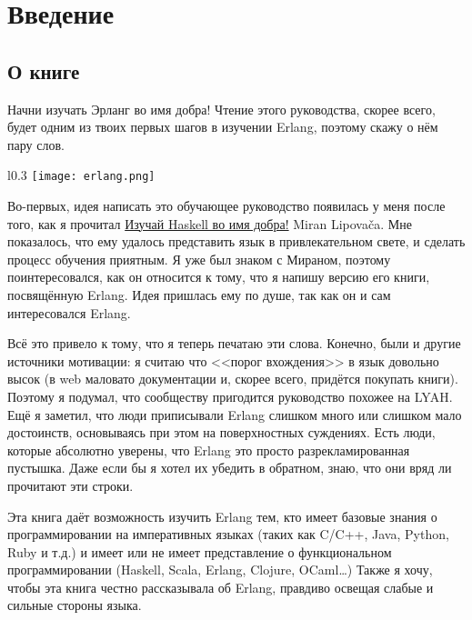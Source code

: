 \chapter{Введение}\label{introduction}

\section{О книге}

Начни изучать Эрланг во имя добра!
Чтение этого руководства, скорее всего, будет одним из твоих первых шагов в изучении Erlang, поэтому скажу о нём пару слов.

\begin{wrapfigure}{l}{0.3\linewidth}
    \texttt{[image: erlang.png]}
\end{wrapfigure}

Во\--первых, идея написать это обучающее руководство появилась у меня после того, как я прочитал \href{http://learnyouahaskell.com}{Изучай Haskell во имя добра!} Miran Lipova\v{c}a.
Мне показалось, что ему удалось представить язык в привлекательном свете, и сделать процесс обучения приятным.
Я уже был знаком с Мираном, поэтому поинтересовался, как он относится к тому, что я напишу версию его книги, посвящённую Erlang.
Идея пришлась ему по душе, так как он и сам интересовался Erlang.

Всё это привело к тому, что я теперь печатаю эти слова.
Конечно, были и другие источники мотивации: я считаю что <<порог вхождения>> в язык довольно высок (в web маловато документации и, скорее всего, придётся покупать книги).
Поэтому я подумал, что сообществу пригодится руководство похожее на LYAH.
Ещё я заметил, что люди приписывали Erlang слишком много или слишком мало достоинств, основываясь при этом на поверхностных суждениях.
Есть люди, которые абсолютно уверены, что Erlang это просто разрекламированная пустышка.
Даже если бы я хотел их убедить в обратном, знаю, что они вряд ли прочитают эти строки.

Эта книга даёт возможность изучить Erlang тем, кто имеет базовые знания о программировании на императивных языках (таких как C/C++, Java, Python, Ruby и т.д.) и имеет или не имеет представление о функциональном программировании (Haskell, Scala, Erlang, Clojure, OCaml\ldots)
Также я хочу, чтобы эта книга честно рассказывала об Erlang, правдиво освещая слабые и сильные стороны языка.

